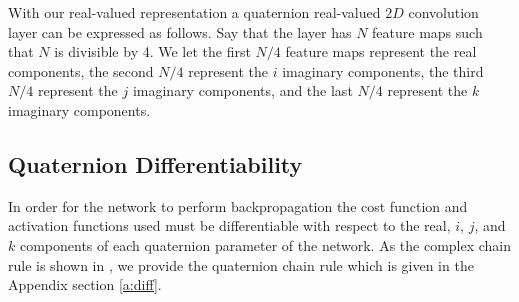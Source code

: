 With our real-valued representation a quaternion real-valued $2D$ convolution layer can be expressed as follows. 
Say that the layer has $N$ feature maps such that $N$ is divisible by 4.
We let the first $N/4$ feature maps represent the real components, the second $N/4$ represent the $i$ imaginary components, the third $N/4$ represent the $j$ imaginary components, and the last $N/4$ represent the $k$ imaginary components.


\subsection{Quaternion Differentiability}
In order for the network to perform backpropagation the cost function and activation functions used must be differentiable with respect to the real, $i$, $j$, and $k$ components of each quaternion parameter of the network.
As the complex chain rule is shown in \cite{trabelsi2017deep}, we provide the quaternion chain rule which is given in the Appendix section \ref{a:diff}.



